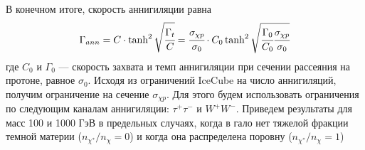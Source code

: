 В конечном итоге, скорость аннигиляции равна
\begin{equation}
	\Gamma_{ann} = C \cdot \tanh^2{\sqrt{\cfrac{\Gamma_t}{C}}} = 
	\cfrac{\sigma_{\chi p}}{\sigma_0} \cdot {C_0} 
	\tanh^2{ \sqrt{\cfrac{\Gamma_0}{C_0} \cfrac{\sigma_{\chi p}}{\sigma_0}}}
\end{equation}
где $C_0$ и $\Gamma_0$ --- скорость захвата и темп аннигиляции при сечении рассеяния на протоне, равное $\sigma_{0}$. Исходя из ограничений IceCube на число аннигиляций, получим ограничение на сечение $\sigma_{\chi p}$. Для этого будем использовать ограничения по следующим каналам аннигиляции: $\tau^+\tau^-$ и $W^+W^-$. Приведем результаты для масс 100 и 1000 ГэВ в предельных случаях, когда в гало нет тяжелой фракции темной материи ($n_{\chi^*}/n_{\chi}= 0$) и когда она распределена поровну ($n_{\chi^*}/n_{\chi}= 1$)

